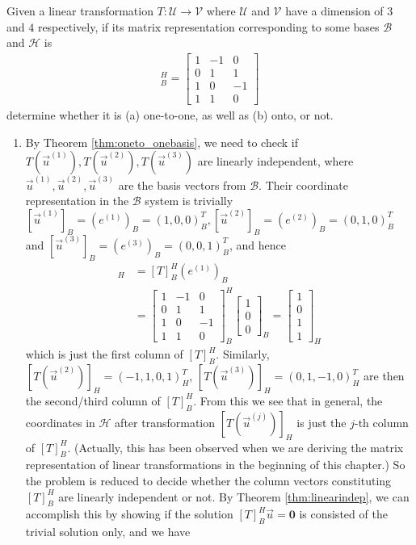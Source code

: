 \begin{exmp}
Given a linear transformation $T: \mathcal{U} \to \mathcal{V}$ where $\mathcal{U}$ and $\mathcal{V}$ have a dimension of $3$ and $4$ respectively, if its matrix representation corresponding to some bases $\mathcal{B}$ and $\mathcal{H}$ is
\begin{align*}
[T]_B^H =
\begin{bmatrix}
1 & -1 & 0 \\
0 & 1 & 1 \\
1 & 0 & -1 \\
1 & 1 & 0
\end{bmatrix}
\end{align*}
determine whether it is (a) one-to-one, as well as (b) onto, or not.
\end{exmp}
\begin{solution}
\begin{enumerate}[label=(\alph*)]
    \item By Theorem \ref{thm:oneto_onebasis}, we need to check if $T(\vec{u}^{(1)}), T(\vec{u}^{(2)}), T(\vec{u}^{(3)})$ are linearly independent, where $\vec{u}^{(1)}, \vec{u}^{(2)}, \vec{u}^{(3)}$ are the basis vectors from $\mathcal{B}$. Their coordinate representation in the $\mathcal{B}$ system is trivially $[\vec{u}^{(1)}]_B = (e^{(1)})_B = (1,0,0)_B^T, [\vec{u}^{(2)}]_B = (e^{(2)})_B = (0,1,0)_B^T$ and $[\vec{u}^{(3)}]_B = (e^{(3)})_B = (0,0,1)_B^T$, and hence
    \begin{align*}
    [T(\vec{u}^{(1)})]_H &= [T]_B^H(e^{(1)})_B \\
    &= 
    \begin{bmatrix}
    1 & -1 & 0 \\
    0 & 1 & 1 \\
    1 & 0 & -1 \\
    1 & 1 & 0
    \end{bmatrix}_B^H
    \begin{bmatrix}
    1 \\
    0 \\
    0
    \end{bmatrix}_B = 
    \begin{bmatrix}
    1 \\
    0 \\
    1 \\
    1
    \end{bmatrix}_H
    \end{align*}
    which is just the first column of $[T]_B^H$. Similarly, $[T(\vec{u}^{(2)})]_H = (-1,1,0,1)_H^T$, $[T(\vec{u}^{(3)})]_H = (0,1,-1,0)_H^T$ are then the second/third column of $[T]_B^H$. From this we see that in general, the coordinates in $\mathcal{H}$ after transformation $[T(\vec{u}^{(j)})]_H$ is just the $j$-th column of $[T]_B^H$. (Actually, this has been observed when we are deriving the matrix representation of linear transformations in the beginning of this chapter.) So the problem is reduced to decide whether the column vectors constituting $[T]_B^H$ are linearly independent or not. By Theorem \ref{thm:linearindep}, we can accomplish this by showing if the solution $[T]_B^H\vec{u} = \textbf{0}$ is consisted of the trivial solution only, and we have

\end{enumerate}
\end{solution}
